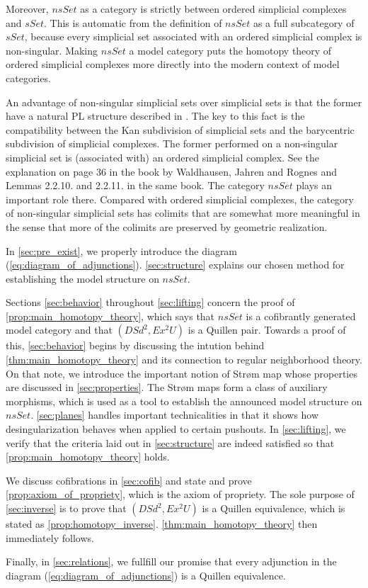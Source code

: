 Moreover, $nsSet$ as a category is strictly between ordered simplicial complexes and $sSet$. This is automatic from the definition of $nsSet$ as a full subcategory of $sSet$, because every simplicial set associated with an ordered simplicial complex is non-singular. Making $nsSet$ a model category puts the homotopy theory of ordered simplicial complexes more directly into the modern context of model categories.

An advantage of non-singular simplicial sets over simplicial sets is that the former have a natural PL structure described in \cite[Sec.~3.4,~p.~126--127]{WJR13}. The key to this fact is the compatibility between the Kan subdivision of simplicial sets and the barycentric subdivision of simplicial complexes. The former performed on a non-singular simplicial set is (associated with) an ordered simplicial complex. See the explanation on page 36 in the book by Waldhausen, Jahren and Rognes \cite{WJR13} and Lemmas 2.2.10. and 2.2.11. \cite[p.~38]{WJR13} in the same book. The category $nsSet$ plays an important role there. Compared with ordered simplicial complexes, the category of non-singular simplicial sets has colimits that are somewhat more meaningful in the sense that more of the colimits are preserved by geometric realization.

In \cref{sec:pre_exist}, we properly introduce the diagram (\ref{eq:diagram_of_adjunctions}). \cref{sec:structure} explains our chosen method for establishing the model structure on $nsSet$.

Sections \ref{sec:behavior} throughout \ref{sec:lifting} concern the proof of \cref{prop:main_homotopy_theory}, which says that $nsSet$ is a cofibrantly generated model category and that $(DSd^2,Ex^2U)$ is a Quillen pair. Towards a proof of this, \cref{sec:behavior} begins by discussing the intution behind \cref{thm:main_homotopy_theory} and its connection to regular neighborhood theory. On that note, we introduce the important notion of Str\o m map whose properties are discussed in \cref{sec:properties}. The Str\o m maps form a class of auxiliary morphisms, which is used as a tool to establish the announced model structure on $nsSet$. \cref{sec:planes} handles important technicalities in that it shows how desingularization behaves when applied to certain pushouts. In \cref{sec:lifting}, we verify that the criteria laid out in \cref{sec:structure} are indeed satisfied so that \cref{prop:main_homotopy_theory} holds.

We discuss cofibrations in \cref{sec:cofib} and state and prove \cref{prop:axiom_of_propriety}, which is the axiom of propriety. The sole purpose of \cref{sec:inverse} is to prove that $(DSd^2,Ex^2U)$ is a Quillen equivalence, which is stated as \cref{prop:homotopy_inverse}. \cref{thm:main_homotopy_theory} then immediately follows.

Finally, in \cref{sec:relations}, we fullfill our promise that every adjunction in the diagram (\ref{eq:diagram_of_adjunctions}) is a Quillen equivalence.
